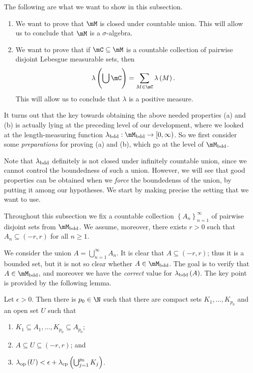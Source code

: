 \documentclass[pmath450]{subfiles}
\begin{document}
    \clearpage
    \np The following are what we want to show in this subsection.
    \begin{enumerate}
        \item We want to prove that $\mM$ is closed under countable union. This will allow us to conclude that $\mM$ is a $\sigma$-algebra.
        \item We want to prove that if $\mC\subseteq\mM$ is a countable collection of pairwise disjoint Lebesgue measurable sets, then
            \begin{equation*}
                \lambda\left( \bigcup^{}_{}\mC \right) = \sum^{}_{M\in\mC}\lambda\left( M \right).
            \end{equation*}
            This will allow us to conclude that $\lambda$ is a positive measure.
    \end{enumerate}
    It turns out that the key towards obtaining the above needed properties (a) and (b) is actually lying at the preceding level of our development, where we looked at the length-measuring function $\lambda_{\bdd}:\mM_{\bdd}\to\left[ 0,\infty \right)$. So we first consider some \textit{preparations} for proving (a) and (b), which go at the level of $\mM_{\bdd}$.

    \np Note that $\lambda_{\operatorname{bdd}}$ definitely is not closed under infinitely countable union, since we cannot control the boundedness of such a union. However, we will see that good properties can be obtained when we \textit{force} the boundedenss of the union, by putting it among our hypotheses. We start by making precise the setting that we want to use.

    Throughout this subsection we fix a countable collection $\left\lbrace A_n \right\rbrace^{\infty}_{n=1}$ of pairwise disjoint sets from $\mM_{\bdd}$. We assume, moreover, there exists $r>0$ such that $A_n\subseteq\left( -r,r \right)$ for all $n\geq 1$. 

    We consider the union $A=\bigcup^{\infty}_{n=1}A_n$. It is clear that $A\subseteq\left( -r,r \right)$; thus it is a bounded set, but it is not so clear whether $A\in\mM_{\bdd}$. The goal is to verify that $A\in\mM_{\bdd}$, and moreover we have the \textit{correct} value for $\lambda_{\operatorname{bdd}}\left( A \right)$. The key point is provided by the following lemma.

    \begin{lemma}{}
        Let $\epsilon>0$. Then there is $p_0\in\N$ such that there are compact sets $K_1,\ldots,K_{p_0}$ and an open set $U$ such that
        \begin{enumerate}
            \item $K_1\subseteq A_1, \ldots, K_{p_0}\subseteq A_{p_0}$;
            \item $A\subseteq U\subseteq\left( -r,r \right)$; and
            \item $\lambda_{\operatorname{op}}\left( U \right)<\epsilon+\lambda_{\operatorname{cp}}\left( \bigcup^{p_0}_{j=1}K_j \right)$.
        \end{enumerate}
    \end{lemma}
\end{document}
